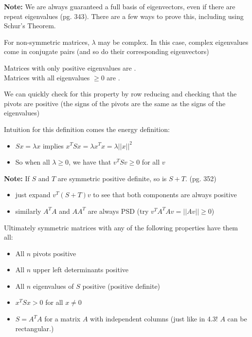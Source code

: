 \documentclass[12pt]{article} %
\begin{document}
\textbf{Note:} We are always guaranteed a full basis of eigenvectors, even if there are repeat eigenvalues (pg. 343). There are a few ways to prove this, including using Schur's Theorem.


\separate
For non-symmetric matrices, $\lambda$ may be complex. In this case, complex eigenvalues come in conjugate pairs (and so do their corresponding eigenvectors)


 
Matrices with only positive eigenvalues are . \\
Matrices with all eigenvalues $\geq 0$ are .

We can quickly check for this property by row reducing and checking that the pivots are positive (the signs of the pivots are the same as the signs of the eigenvalues)

Intuition for this definition comes the energy definition:
\begin{itemize}[topsep=-1pt,itemsep=-1pt]
    \item $Sx = \lambda x$ implies $x^TSx = \lambda x^Tx = \lambda ||x||^2$
    \item So when all $\lambda \geq 0$, we have that $v^TSv \geq 0$ for all $v$
\end{itemize}

\textbf{Note:} If $S$ and $T$ are symmetric positive definite, so is $S+T$. (pg. 352)
\begin{itemize}[topsep=-1pt,itemsep=-1pt]
    \item just expand $v^T(S+T)v$ to see that both components are always positive
    \item similarly $A^TA$ and $AA^T$ are always PSD (try $v^TA^TAv = ||Av|| \geq 0$)
\end{itemize}

Ultimately symmetric matrices with any of the following properties have them all:
\begin{itemize}[topsep=-1pt,itemsep=-1pt]
    \item All $n$ pivots positive
    \item All $n$ upper left determinants positive
    \item All $n$ eigenvalues of $S$ positive (positive definite)
    \item $x^TSx > 0$ for all $x \neq 0$
    \item $S = A^TA$ for a matrix $A$ with independent columns (just like in 4.3! $A$ can be rectangular.)
\end{itemize}
\end{document}
